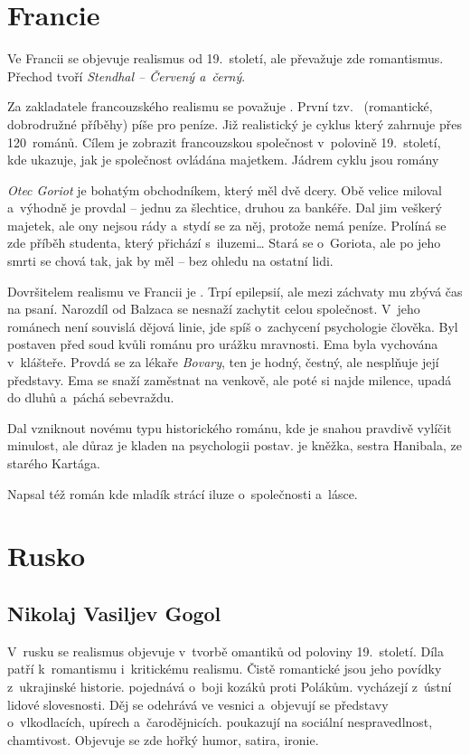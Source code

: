 \section{Francie}
Ve Francii se objevuje realismus od 19.~století, ale převažuje zde
romantismus. Přechod tvoří \emph{Stendhal -- Červený a~černý}.

Za zakladatele francouzského realismu se považuje . První tzv.~ (romantické, dobrodružné příběhy)
píše pro peníze. Již realistický je cyklus  který
zahrnuje přes 120~románů. Cílem je zobrazit francouzskou společnost
v~polovině 19.~století, kde ukazuje, jak je společnost ovládána
majetkem. Jádrem cyklu jsou romány  

\emph{Otec Goriot} je bohatým obchodníkem, který měl dvě dcery. Obě
velice miloval a~výhodně je provdal -- jednu za šlechtice, druhou 
za bankéře. Dal jim veškerý majetek, ale ony nejsou rády a~stydí se 
za něj, protože nemá peníze. Prolíná se zde příběh studenta,
který přichází s~iluzemi\dots{} Stará se o~Goriota, ale po jeho smrti
se chová tak, jak by měl -- bez ohledu na ostatní lidi.

Dovršitelem realismu ve Francii je . Trpí
epilepsií, ale mezi záchvaty mu zbývá čas na psaní. Narozdíl od Balzaca
se nesnaží zachytit celou společnost. V~jeho románech není souvislá
dějová linie, jde spíš o~zachycení psychologie člověka. Byl postaven
před soud kvůli románu  pro urážku mravnosti. Ema
byla vychována v~klášteře. Provdá se za lékaře \emph{Bovary}, ten je
hodný, čestný, ale nesplňuje její představy. Ema se snaží zaměstnat na
venkově, ale poté si najde milence, upadá do dluhů a~páchá sebevraždu.

Dal vzniknout novému typu historického románu, kde je snahou
pravdivě vylíčit minulost, ale důraz je kladen na psychologii postav.
 je kněžka, sestra Hanibala, ze starého Kartága.

Napsal též román  kde mladík strácí iluze
o~společnosti a~lásce.

\section{Rusko} 
\subsection*{Nikolaj Vasiljev Gogol}
V~rusku se realismus objevuje v~tvorbě omantiků od poloviny 19.~století.
Díla  patří
k~romantismu i~kritickému realismu. Čistě romantické jsou jeho povídky
z~ukrajinské historie.  pojednává o~boji kozáků proti
Polákům.  vycházejí z~ústní
lidové slovesnosti. Děj se odehrává ve vesnici a~objevují se představy
o~vlkodlacích, upírech a~čarodějnicích.
 poukazují na sociální nespravedlnost,
chamtivost. Objevuje se zde hořký humor, satira, ironie. 


